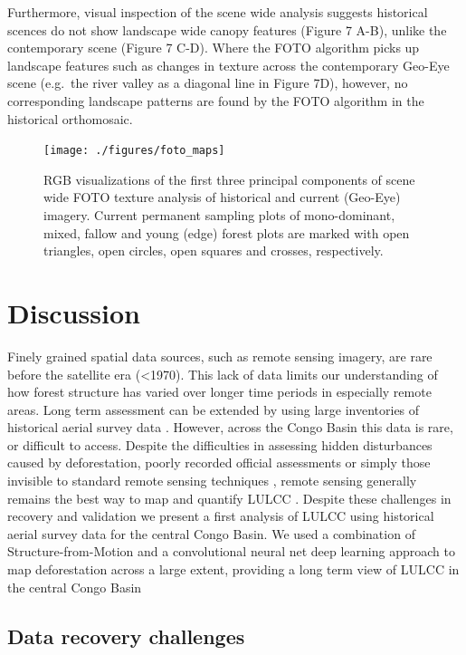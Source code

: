 \documentclass[remote sensing,article,submit,moreauthors,pdftex,10pt,a4paper]{mdpi}
\begin{document}
Furthermore, visual inspection of the scene wide analysis suggests
historical scences do not show landscape wide canopy features (Figure 7
A-B), unlike the contemporary scene (Figure 7 C-D). Where the FOTO
algorithm picks up landscape features such as changes in texture across
the contemporary Geo-Eye scene (e.g.~the river valley as a diagonal line
in Figure 7D), however, no corresponding landscape patterns are found by
the FOTO algorithm in the historical orthomosaic.

\begin{figure}
\texttt{[image: ./figures/foto\_maps]} \caption{RGB visualizations of the first three principal components of scene wide FOTO texture analysis of historical and current (Geo-Eye) imagery. Current permanent sampling plots of mono-dominant, mixed, fallow and young (edge) forest plots are marked with open triangles, open circles, open squares and crosses, respectively.}\label{fig:unnamed-chunk-9}
\end{figure}

\hypertarget{discussion}{%
\section{Discussion}\label{discussion}}

Finely grained spatial data sources, such as remote sensing imagery, are
rare before the satellite era (\textless{}1970). This lack of data
limits our understanding of how forest structure has varied over longer
time periods in especially remote areas. Long term assessment can be
extended by using large inventories of historical aerial survey data
\citep{kadmon1999, song2015, nita2018}. However, across the Congo Basin
this data is rare, or difficult to access. Despite the difficulties in
assessing hidden disturbances caused by deforestation, poorly recorded
official assessments or simply those invisible to standard remote
sensing techniques \citep{peres2006}, remote sensing generally remains
the best way to map and quantify LULCC \citep{houghton2012}. Despite
these challenges in recovery and validation we present a first analysis
of LULCC using historical aerial survey data for the central Congo
Basin. We used a combination of Structure-from-Motion and a
convolutional neural net deep learning approach to map deforestation
across a large extent, providing a long term view of LULCC in the
central Congo Basin

\hypertarget{data-recovery-challenges}{%
\subsection{Data recovery challenges}\label{data-recovery-challenges}}
\end{document}
